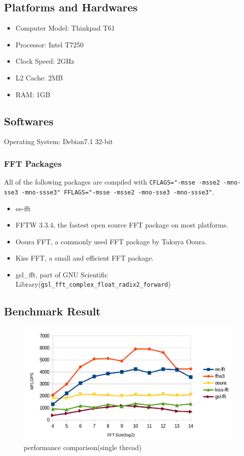 \documentclass[a4paper]{report}
\begin{document}
\subsection{Platforms and Hardwares} \indent

\begin{itemize}
	\item Computer Model: Thinkpad T61
	\item Processor: Intel T7250
	\item Clock Speed: 2GHz
	\item L2 Cache: 2MB
	\item RAM: 1GB
\end{itemize}

\subsection{Softwares} \indent

	Operating System: Debian7.1 32-bit

\subsubsection{FFT Packages} \indent

	All of the following packages are compiled with \texttt{CFLAGS="-msse -msse2 -mno-sse3 -mno-ssse3" FFLAGS="-msse -msse2 -mno-sse3 -mno-ssse3"}.

\begin{itemize}
	\item ee-fft
	\item FFTW 3.3.4, the fastest open source FFT package on most platforms\cite{fftw}.
	\item Ooura FFT, a commonly used FFT package by Takuya Ooura.
	\item Kiss FFT, a small and efficient FFT package.
	\item gsl\_fft, part of GNU Scientific Library(\texttt{gsl\_fft\_complex\_float\_radix2\_forward})
\end{itemize}

\subsection{Benchmark Result} \indent

\begin{figure}[htp]
\centering
\includegraphics[scale=0.4]{bench.png}
\caption{performance comparison(single thread)}
\end{figure}
\end{document}
